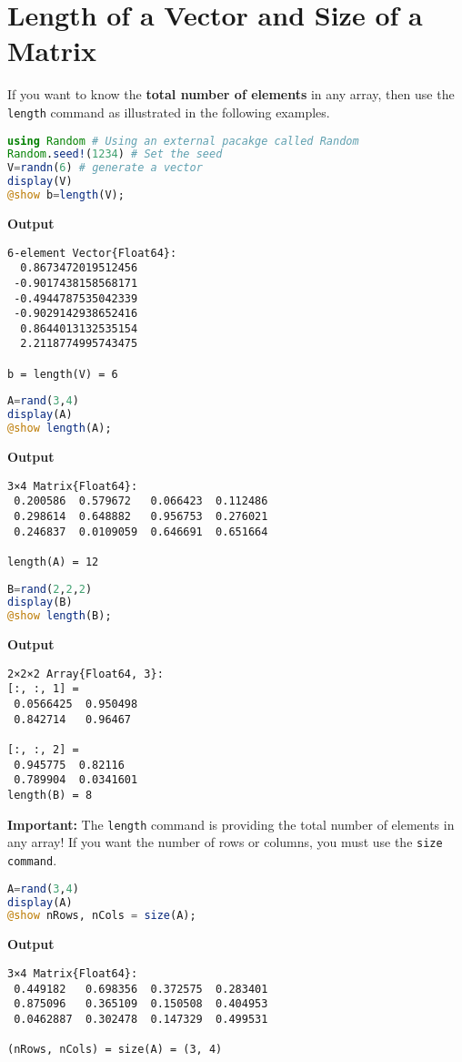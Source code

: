 \section{Length of a Vector and Size of a Matrix}

If you want to know the \textbf{total number of elements} in any array, then use the \texttt{length} command as illustrated in the following examples.



\begin{lstlisting}[language=Julia,style=mystyle]
using Random # Using an external pacakge called Random 
Random.seed!(1234) # Set the seed
V=randn(6) # generate a vector
display(V)
@show b=length(V);
\end{lstlisting}
\textbf{Output} 
\begin{verbatim}
6-element Vector{Float64}:
  0.8673472019512456
 -0.9017438158568171
 -0.4944787535042339
 -0.9029142938652416
  0.8644013132535154
  2.2118774995743475
  
b = length(V) = 6
\end{verbatim}

\begin{lstlisting}[language=Julia,style=mystyle]
A=rand(3,4)
display(A)
@show length(A);
\end{lstlisting}
\textbf{Output} 
\begin{verbatim}
3×4 Matrix{Float64}:
 0.200586  0.579672   0.066423  0.112486
 0.298614  0.648882   0.956753  0.276021
 0.246837  0.0109059  0.646691  0.651664
 
length(A) = 12
\end{verbatim}


\begin{lstlisting}[language=Julia,style=mystyle]
B=rand(2,2,2)
display(B)
@show length(B);
\end{lstlisting}
\textbf{Output} 
\begin{verbatim}
2×2×2 Array{Float64, 3}:
[:, :, 1] =
 0.0566425  0.950498
 0.842714   0.96467

[:, :, 2] =
 0.945775  0.82116
 0.789904  0.0341601
length(B) = 8
\end{verbatim}

\textbf{Important:} The \texttt{length} command is providing the total number of elements in any array! If you want the number of rows or columns, you must use the \texttt{size command}.


\begin{lstlisting}[language=Julia,style=mystyle]
A=rand(3,4)
display(A)
@show nRows, nCols = size(A);
\end{lstlisting}
\textbf{Output} 
\begin{verbatim}
3×4 Matrix{Float64}:
 0.449182   0.698356  0.372575  0.283401
 0.875096   0.365109  0.150508  0.404953
 0.0462887  0.302478  0.147329  0.499531
 
(nRows, nCols) = size(A) = (3, 4)
\end{verbatim}

